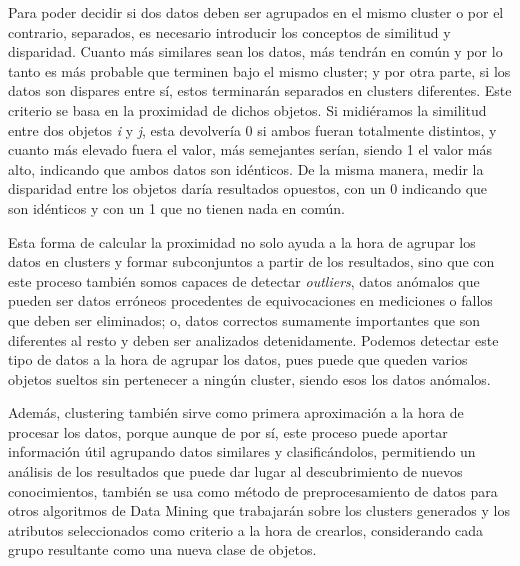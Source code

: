 \documentclass[10pt, a4paper]{article}
\begin{document}
Para poder decidir si dos datos deben ser agrupados en el mismo cluster o por el contrario, separados, es necesario introducir los conceptos de similitud y disparidad. Cuanto más similares sean los datos, más tendrán en común y por lo tanto es más probable que terminen bajo el mismo cluster; y por otra parte, si los datos son dispares entre sí, estos terminarán separados en clusters diferentes. Este criterio se basa en la proximidad de dichos objetos. Si midiéramos la similitud entre dos objetos \textit{i} y \textit{j}, esta devolvería 0 si ambos fueran totalmente distintos, y cuanto más elevado fuera el valor, más semejantes serían, siendo 1 el valor más alto, indicando que ambos datos son idénticos. De la misma manera, medir la disparidad entre los objetos daría resultados opuestos, con un 0 indicando que son idénticos y con un 1 que no tienen nada en común. 

Esta forma de calcular la proximidad no solo ayuda a la hora de agrupar los datos en clusters y formar subconjuntos a partir de los resultados, sino que con este proceso también somos capaces de detectar \textit{outliers}, datos anómalos que pueden ser datos erróneos procedentes de equivocaciones en mediciones o fallos que deben ser eliminados; o, datos correctos sumamente importantes que son diferentes al resto y deben ser analizados detenidamente. Podemos detectar este tipo de datos a la hora de agrupar los datos, pues puede que queden varios objetos sueltos sin pertenecer a ningún cluster, siendo esos los datos anómalos.

Además, clustering también sirve como primera aproximación a la hora de procesar los datos, porque aunque de por sí, este proceso puede aportar información útil agrupando datos similares y clasificándolos, permitiendo un análisis de los resultados que puede dar lugar al descubrimiento de nuevos conocimientos, también se usa como método de preprocesamiento de datos para otros algoritmos de Data Mining que trabajarán sobre los clusters generados y los atributos seleccionados como criterio a la hora de crearlos, considerando cada grupo resultante como una nueva clase de objetos.
\end{document}
